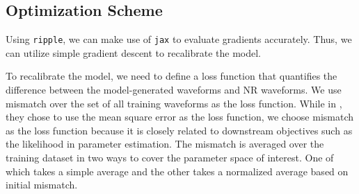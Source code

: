 \documentclass[twocolumn]{aastex631}
\newcommand{\kw}[1]{{\color{rb4}[KW: #1 ]}}
\newcommand{\ripple}{\texttt{ripple}}
\newcommand{\jax}{\texttt{jax}}
\begin{document}
\subsection{Optimization Scheme} \label{subsec:optimization}

Using \ripple, we can make use of {\jax} to evaluate gradients accurately. Thus, we can utilize simple gradient descent to recalibrate the model. 



To recalibrate the model, we need to define a loss function that quantifies the difference between the model-generated waveforms and NR waveforms. We use mismatch over the set of all training waveforms as the loss function. While in \cite{khan2016frequency}, they chose to use the mean square error as the loss function, we choose mismatch as the loss function because it is closely related to downstream objectives such as the likelihood in parameter estimation. The mismatch is averaged over the training dataset in two ways to cover the parameter space of interest. One of which takes a simple average and the other takes a normalized average based on initial mismatch.
\end{document}
